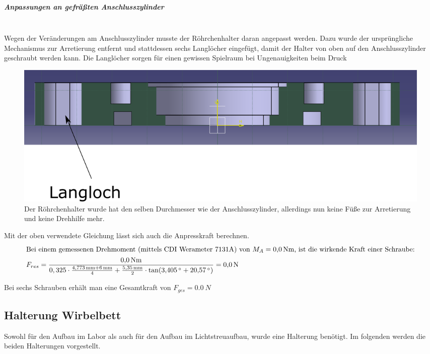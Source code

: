 \subparagraph{Anpassungen an gefräßten Anschlusszylinder}
\hfill \\

Wegen der Veränderungen am Anschlusszylinder musste der Röhrchenhalter daran angepasst werden. Dazu  wurde der ursprüngliche Mechanismus zur Arretierung entfernt und stattdessen sechs Langlöcher eingefügt, damit der Halter von oben auf den Anschlusszylinder geschraubt werden kann. Die Langlöcher sorgen für einen gewissen Spielraum bei Ungenauigkeiten beim Druck

\begin{figure}[h!]
	\begin{center}
		\includegraphics[scale=0.6]{Schnitt_RoehrchenhalterV2.png}
		\caption[Röhrchenhalter V2]{Der Röhrchenhalter wurde hat den selben Durchmesser wie der Anschlusszylinder, allerdings nun keine Füße zur Arretierung und keine Drehhilfe mehr.}
	\end{center}
\end{figure}

Mit der oben verwendete Gleichung lässt sich auch die Anpresskraft berechnen.
\begin{align*}
	\intertext{Bei einem gemessenen Drehmoment (mittels CDI Werameter 7131A) von $M_A = \SI{0,0}{Nm}$, ist die wirkende Kraft einer Schraube:}
	F_{res} &= \frac{\SI{0,0}{Nm}}{0,325 \cdot \frac{\SI{4,773}{mm} + \SI{6}{mm}}{4} + \frac{\SI{5,35}{mm}}{2} \cdot \tan(\SI{3,405}{^\circ} + \SI{20,57}{^\circ})} = \SI{0,0}{N}
\end{align*}

Bei sechs Schrauben erhält man eine Gesamtkraft von $F_{ges} = \SI{0,0}{N}$



\subsection{Halterung Wirbelbett}

Sowohl für den Aufbau im Labor als auch für den Aufbau im Lichtstreuaufbau, wurde eine Halterung benötigt. Im folgenden werden die beiden Halterungen vorgestellt.

